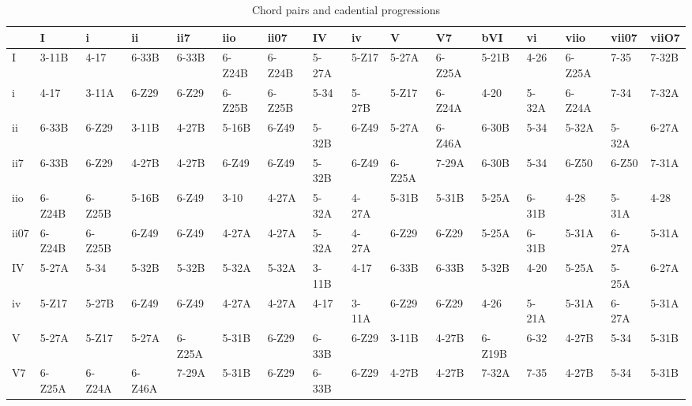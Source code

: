 \documentclass{article}
\begin{document}
\begin{table}
\caption{Chord pairs and cadential progressions} \label{tab:cadences}
\begin{center}
\begin{tabular}{llllllllllllllll}
\hline
        &  I       &  i       &  ii      &  ii7     &  iio     &  ii07    &  IV     &  iv     &  V       &  V7      &  bVI     &  vi      &  viio    &  vii07   &  viiO7  \\
\hline
 I      &  3-11B   &  4-17    &  6-33B   &  6-33B   &  6-Z24B  &  6-Z24B  &  5-27A  &  5-Z17  &  5-27A   &  6-Z25A  &  5-21B   &  4-26    &  6-Z25A  &  7-35    &  7-32B  \\
 i      &  4-17    &  3-11A   &  6-Z29   &  6-Z29   &  6-Z25B  &  6-Z25B  &  5-34   &  5-27B  &  5-Z17   &  6-Z24A  &  4-20    &  5-32A   &  6-Z24A  &  7-34    &  7-32A  \\
 ii     &  6-33B   &  6-Z29   &  3-11B   &  4-27B   &  5-16B   &  6-Z49   &  5-32B  &  6-Z49  &  5-27A   &  6-Z46A  &  6-30B   &  5-34    &  5-32A   &  5-32A   &  6-27A  \\
 ii7    &  6-33B   &  6-Z29   &  4-27B   &  4-27B   &  6-Z49   &  6-Z49   &  5-32B  &  6-Z49  &  6-Z25A  &  7-29A   &  6-30B   &  5-34    &  6-Z50   &  6-Z50   &  7-31A  \\
 iio    &  6-Z24B  &  6-Z25B  &  5-16B   &  6-Z49   &  3-10    &  4-27A   &  5-32A  &  4-27A  &  5-31B   &  5-31B   &  5-25A   &  6-31B   &  4-28    &  5-31A   &  4-28   \\
 ii07   &  6-Z24B  &  6-Z25B  &  6-Z49   &  6-Z49   &  4-27A   &  4-27A   &  5-32A  &  4-27A  &  6-Z29   &  6-Z29   &  5-25A   &  6-31B   &  5-31A   &  6-27A   &  5-31A  \\
 IV     &  5-27A   &  5-34    &  5-32B   &  5-32B   &  5-32A   &  5-32A   &  3-11B  &  4-17   &  6-33B   &  6-33B   &  5-32B   &  4-20    &  5-25A   &  5-25A   &  6-27A  \\
 iv     &  5-Z17   &  5-27B   &  6-Z49   &  6-Z49   &  4-27A   &  4-27A   &  4-17   &  3-11A  &  6-Z29   &  6-Z29   &  4-26    &  5-21A   &  5-31A   &  6-27A   &  5-31A  \\
 V      &  5-27A   &  5-Z17   &  5-27A   &  6-Z25A  &  5-31B   &  6-Z29   &  6-33B  &  6-Z29  &  3-11B   &  4-27B   &  6-Z19B  &  6-32    &  4-27B   &  5-34    &  5-31B  \\
 V7     &  6-Z25A  &  6-Z24A  &  6-Z46A  &  7-29A   &  5-31B   &  6-Z29   &  6-33B  &  6-Z29  &  4-27B   &  4-27B   &  7-32A   &  7-35    &  4-27B   &  5-34    &  5-31B  \\

\end{tabular}
\end{center}
\end{table}
\end{document}

